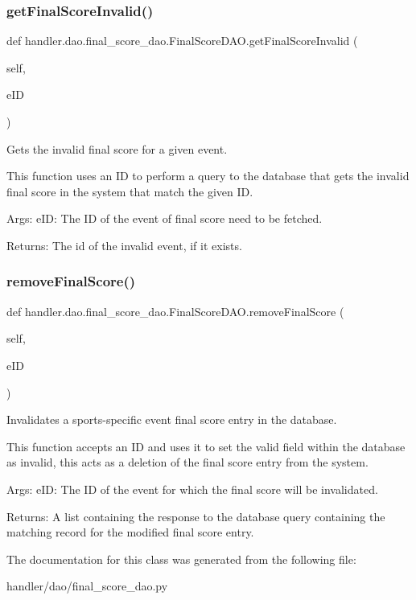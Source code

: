 \subsubsection{\texorpdfstring{get\+Final\+Score\+Invalid()}{getFinalScoreInvalid()}}
{\footnotesize\ttfamily def handler.\+dao.\+final\+\_\+score\+\_\+dao.\+Final\+Score\+D\+A\+O.\+get\+Final\+Score\+Invalid (\begin{DoxyParamCaption}\item[{}]{self,  }\item[{}]{e\+ID }\end{DoxyParamCaption})}

\begin{DoxyVerb}Gets the invalid final score for a given event. 

This function uses an ID to perform a query to the database
that gets the invalid final score in the system that match the given ID.

Args:
    eID: The ID of the event of final score need to be fetched.
    
Returns:
   The id of the invalid event, if it exists. 
\end{DoxyVerb}
 \mbox{\label{classhandler_1_1dao_1_1final__score__dao_1_1_final_score_d_a_o_a750aa3375dc03fbc85025476a9974349}} 
\subsubsection{\texorpdfstring{remove\+Final\+Score()}{removeFinalScore()}}
{\footnotesize\ttfamily def handler.\+dao.\+final\+\_\+score\+\_\+dao.\+Final\+Score\+D\+A\+O.\+remove\+Final\+Score (\begin{DoxyParamCaption}\item[{}]{self,  }\item[{}]{e\+ID }\end{DoxyParamCaption})}

\begin{DoxyVerb}Invalidates a sports-specific event final score entry in the database.

This function accepts an ID and uses it to set the valid field
within the database as invalid, this acts as a deletion of the 
final score entry from the system.

Args:
    eID: The ID of the event for which the final score will be invalidated.
    
Returns:
    A list containing the response to the database query
    containing the matching record for the modified 
    final score entry.
\end{DoxyVerb}
 

The documentation for this class was generated from the following file\+:\begin{DoxyCompactItemize}
\item 
handler/dao/final\+\_\+score\+\_\+dao.\+py\end{DoxyCompactItemize}
